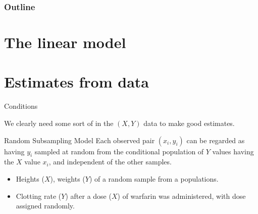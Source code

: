 %
%
%



\subtitle{confidence intervals, outliers, and leverage}

\date{1 December 2015}





\begin{frame}
  \maketitle
\end{frame}


\begin{frame}\frametitle<presentation>{Outline}
  \tableofcontents
\end{frame}


\section{The linear model}


\section{Estimates from data}


\begin{frame}{Conditions}

  We clearly need some sort of  in the $(X,Y)$ data to make good estimates.

    \vspace{2em}

    \begin{block}{Random Subsampling Model}
      Each observed pair $(x_i,y_i)$ can be regarded as having $y_i$ sampled
      at random from the \alert{conditional} population of $Y$ values having the $X$ value $x_i$,
      and independent of the other samples.
    \end{block}

    \vspace{2em}

    \begin{itemize}
      \item Heights ($X$), weights ($Y$) of a random sample from a populations.
      \item Clotting rate ($Y$) after a dose ($X$) of warfarin was administered,
        with dose assigned randomly.
    \end{itemize}

\end{frame}

